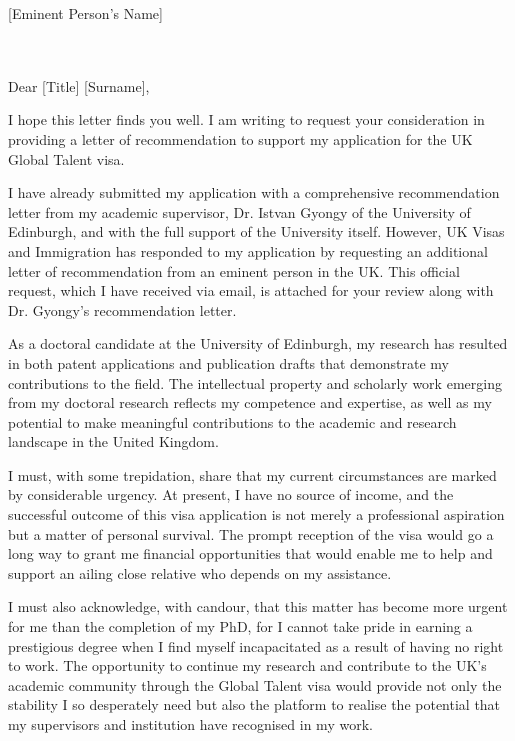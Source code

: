 \documentclass[11pt,a4paper]{letter}
\date{\today}
\begin{document}
\begin{letter}{[Eminent Person's Name]\\[Title/Position]\\[Institution/Organization]\\[Address]}

\opening{Dear [Title] [Surname],}

I hope this letter finds you well. I am writing to request your consideration in providing a letter of recommendation to support my application for the UK Global Talent visa.

I have already submitted my application with a comprehensive recommendation letter from my academic supervisor, Dr. Istvan Gyongy of the University of Edinburgh, and with the full support of the University itself. However, UK Visas and Immigration has responded to my application by requesting an additional letter of recommendation from an eminent person in the UK. This official request, which I have received via email, is attached for your review along with Dr. Gyongy's recommendation letter.

As a doctoral candidate at the University of Edinburgh, my research has resulted in both patent applications and publication drafts that demonstrate my contributions to the field. The intellectual property and scholarly work emerging from my doctoral research reflects my competence and expertise, as well as my potential to make meaningful contributions to the academic and research landscape in the United Kingdom.


I must, with some trepidation, share that my current circumstances are marked by considerable urgency. At present, I have no source of income, and the successful outcome of this visa application is not merely a professional aspiration but a matter of personal survival. The prompt reception of the visa would go a long way to grant me financial opportunities that would enable me to help and support an ailing close relative who depends on my assistance. 

I must also acknowledge, with candour, that this matter has become more urgent for me than the completion of my PhD, for I cannot take pride in earning a prestigious degree when I find myself incapacitated as a result of having no right to work. The opportunity to continue my research and contribute to the UK's academic community through the Global Talent visa would provide not only the stability I so desperately need but also the platform to realise the potential that my supervisors and institution have recognised in my work.


\end{letter}
\end{document}
